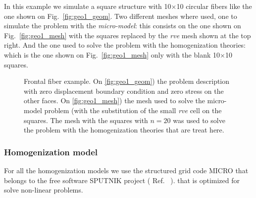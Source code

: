 \documentclass[review]{elsarticle}
\newcommand{\sputnik}{{\ttfamily \fontseries{b}\selectfont SPUTNIK }}
\newcommand{\micro}{{\ttfamily \fontseries{b}\selectfont MICRO }}
\begin{document}
In this example we simulate a square structure with 10$\times$10 circular fibers 
like the one shown on Fig.~\ref{fig:geo1_geom}. 
Two different meshes where used, one to simulate the problem with the
\emph{micro-model}: 
this consists on the one shown on Fig.~\ref{fig:geo1_mesh} with the squares
replaced by the \emph{rve} mesh shown at the top right.
And the one used to solve the problem with the homogenization theories:
which is the one shown on Fig.~\ref{fig:geo1_mesh} only with the blank 
10$\times$10 squares.


\begin{figure}[!ht]
\begin{minipage}[b]{0.47\linewidth}
\subcaptionbox{\label{fig:geo1_geom}}{
\resizebox{8.0cm}{!}{}}
\end{minipage}
\hspace{2.2cm}
\begin{minipage}[b]{0.47\linewidth}
\subcaptionbox{\label{fig:geo1_mesh}}{
\resizebox{8.0cm}{!}{}}
\end{minipage}
\caption{Frontal fiber example. On \ref{fig:geo1_geom}) the problem description
         with zero displacement boundary condition and zero stress on the other faces. On
         \ref{fig:geo1_mesh}) the mesh used to solve the micro-model problem (with the
         substitution of the small \emph{rve} cell on the squares. The mesh with the
         squares with $n=20$ was used to solve the problem with the homogenization
         theories that are treat here. }
\label{fig_dist_scheme}
\end{figure}

\subsubsection{Homogenization model}

For all the homogenization models we use the structured grid code \micro that belongs to the 
free software \sputnik project ( Ref.~\cite{sputnik} ).
that is optimized for solve non-linear problems.
\end{document}
